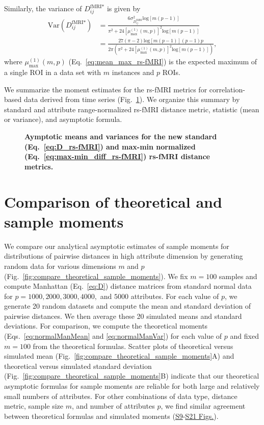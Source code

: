 \documentclass[10pt,letterpaper]{article}
\begin{document}
Similarly, the variance of $D^\text{fMRI*}_{ij}$ is given by
%
\begin{equation}\label{eq:var_max-min_rs-fMRI}
\begin{aligned}
\text{Var}\left(D^\text{fMRI*}_{ij}\right) &= \frac{6\sigma^2_{D^\text{fMRI}_{ij}}\text{log}[m(p-1)]}{\pi^2 + 24\left[\mu^{(1)}_\text{max}(m,p)\right]^2\text{log}[m(p-1)]} \\
&= \frac{27(\pi-2)\text{log}[m(p-1)](p-1)p}{2\pi\left(\pi^2 + 24\left[\mu^{(1)}_\text{max}(m,p)\right]^2\text{log}[m(p-1)]\right)},
\end{aligned}
\end{equation}
%
where $\mu^{(1)}_\text{max}(m,p)$ (Eq.~\ref{eq:mean_max_rs-fMRI}) is the expected maximum of a single ROI in a data set with $m$ instances and $p$ ROIs.

We summarize the moment estimates for the rs-fMRI metrics for correlation-based data derived from time series (Fig.~\ref{tab:dist_distr_rs-fMRI}). We organize this summary by standard and attribute range-normalized rs-fMRI distance metric, statistic (mean or variance), and asymptotic formula.


\begin{figure}[H]
	\centering
	\caption{{\bf Aymptotic means and variances for the new standard (Eq.~\ref{eq:D_rs-fMRI}) and max-min normalized (Eq.~\ref{eq:max-min_diff_rs-fMRI}) rs-fMRI distance metrics.}}
	\label{tab:dist_distr_rs-fMRI}
\end{figure}

\section{Comparison of theoretical and sample moments}

We compare our analytical asymptotic estimates of sample moments for distributions of pairwise distances in high attribute dimension by generating random data for various dimensions $m$ and $p$ (Fig.~\ref{fig:compare_theoretical_sample_moments}). We fix $m=100$ samples and compute Manhattan (Eq.~\ref{eq:D}) distance matrices from standard normal data for $p=1000,2000,3000,4000,$ and $5000$ attributes. For each value of $p$, we generate 20 random datasets and compute the mean and standard deviation of pairwise distances. We then average these 20 simulated means and standard deviations. For comparison, we compute the theoretical moments (Eqs.~\ref{eq:normalManMean} and \ref{eq:normalManVar}) for each value of $p$ and fixed $m=100$ from the theoretical formulas. Scatter plots of theoretical versus simulated mean (Fig.~\ref{fig:compare_theoretical_sample_moments}A) and theoretical versus simulated standard deviation (Fig.~\ref{fig:compare_theoretical_sample_moments}B) indicate that our theoretical asymptotic formulas for sample moments are reliable for both large and relatively small numbers of attributes. For other combinations of data type, distance metric, sample size $m$, and number of attributes $p$, we find similar agreement between theoretical formulas and simulated moments (\hyperlink{S9_Fig}{S9}-\hyperlink{S21_Fig}{S21 Figs.}).
\end{document}
